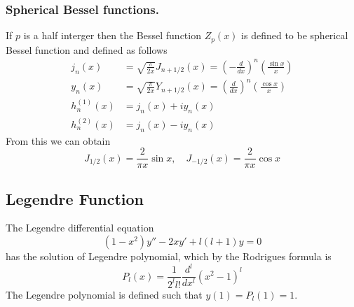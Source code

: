 \documentclass[../main.tex]{subfiles}
\begin{document}
\subsubsection*{Spherical Bessel functions.} If $p$ is a half interger
then the Bessel function $Z_p(x)$ is defined to be spherical Bessel function and defined as follows
\begin{align*}
    j_n(x)&=\sqrt{\frac{\pi}{2x}}J_{n+1/2}(x)=\left(-\frac{d}{dx}\right)^n\left(\frac{\sin x}{x}\right)\\
    y_n(x)&=\sqrt{\frac{\pi}{2x}}Y_{n+1/2}(x)=\left(\frac{d}{dx}\right)^n\left(\frac{\cos x}{x}\right)\\
    h_n^{(1)}(x)&=j_n(x)+iy_n(x)\\
    h_n^{(2)}(x)&=j_n(x)-iy_n(x)
\end{align*}
From this we can obtain 
\begin{equation*}
    J_{1/2}(x)=\frac{2}{\pi x}\sin x, \quad J_{-1/2}(x)=\frac{2}{\pi x}\cos x
\end{equation*} 

\subsection*{Legendre Function}
The Legendre differential equation
\begin{equation*}
    (1-x^2)y''-2xy'+l(l+1)y=0
\end{equation*}
has the solution of Legendre polynomial, which by the Rodrigues formula is 
\begin{equation*}
    P_l(x)=\frac{1}{2^ll!}\frac{d^l}{dx^l}(x^2-1)^l
\end{equation*}
The Legendre polynomial is defined such that $y(1)=P_l(1)=1$.
\end{document}
